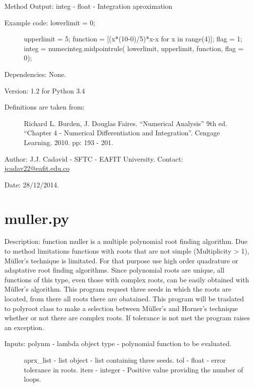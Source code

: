 \documentclass[letterpaper,10pt,oneside]{sphinxmanual}
\theoremstyle{plain}%
\theoremstyle{definition}%
\theoremstyle{remark}%
\begin{document}
Method Output: integ - float - Integration aproximation
\begin{description}
\item[{Example code: lowerlimit = 0;}] \leavevmode
upperlimit = 5;
function = {[}(x*(10-0)/5)*x-x for x in range(4){]};
flag = 1;
integ =                   numecinteg.midpointrule(
lowerlimit, upperlimit, function, flag = 0);

\end{description}

Dependencies: None.

Version: 1.2 for Python 3.4
\begin{description}
\item[{Definitions are taken from:}] \leavevmode
Richard L. Burden, J. Douglas Faires. ``Numerical Analysis'' 9th ed.
``Chapter 4 - Numerical Differentiation and Integration''. 
Cengage Learning. 2010. pp: 193 - 201.

\end{description}

Author: J.J. Cadavid - SFTC - EAFIT University.
Contact: \href{mailto:jcadav22@eafit.edu.co}{jcadav22@eafit.edu.co}

Date: 28/12/2014.


\section{muller.py}
\label{code:module-muller}\label{code:muller-py}
Description: function muller is a multiple polynomial root finding algorithm.
Due to method limitations functions with roots that are not simple
(Multiplicity \textgreater{} 1), Müller's technique is limitated. For that purpose use
high order quadrature or adaptative root finding algorithms. Since polynomial
roots are unique, all functions of this type, even those with complex roots,
can be easily obtained with Müller's algorithm. This program request
three seeds in which the roots are located, from there all roots there are
obatained. This program will be traslated to polyroot class to make a
selection between  Müller's and Horner's technique whether or not there are
complex roots. If tolerance is not met the program raises an exception.
\begin{description}
\item[{Inputs: polynm - lambda object type - polynomial function to be evaluated.}] \leavevmode
aprx\_list - list object - list containing three seeds.
tol - float - error tolerance in roots.
iters - integer - Positive value providing the number of loops.

\end{description}
\end{document}
